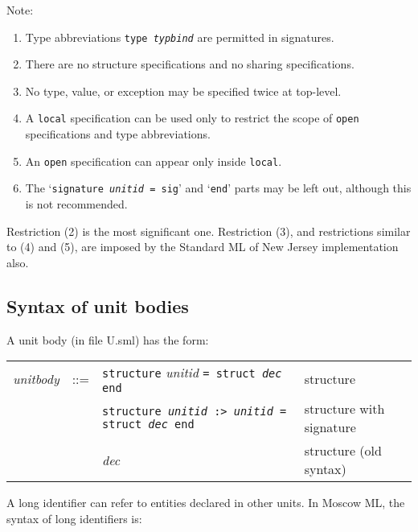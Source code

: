 \documentclass[fleqn]{article}
\begin{document}
\noindent Note:

\begin{enumerate}
\item Type abbreviations {\tt type {\it typbind\/}} are permitted in
  signatures.  

\item There are no structure specifications and no sharing
  specifications.

\item No type, value, or exception may be specified twice at
  top-level.

\item A {\tt local} specification can be used only to restrict the
  scope of {\tt open} specifications and type abbreviations.

\item An {\tt open} specification can appear only inside {\tt local}.

\item The `{\tt signature {\it unitid\/} = sig}' and `{\tt end}' parts
  may be left out, although this is not recommended.
\end{enumerate}

\noindent Restriction (2) is the most significant one.  Restriction
(3), and restrictions similar to (4) and (5), are imposed by the
Standard ML of New Jersey implementation also.


\subsection{Syntax of unit bodies}

A unit body (in file U.sml) has the form:

\begin{quot}
\begin{tabular}{@{}llll}
{\it unitbody\/} & ::= 
  & {\tt structure} {\it unitid} {\tt = struct {\it dec\/} end} 
                                                & structure \\
& & {\tt structure {\it unitid\/} :> {\it unitid\/} = struct {\it dec\/} end}
                                                & structure with
                                                signature \\
& & {\it dec\/}                                 & structure (old syntax)\\
\end{tabular}
\end{quot}

\noindent A long identifier can refer to entities declared in other
units.  In Moscow ML, the syntax of long identifiers is:
\end{document}
